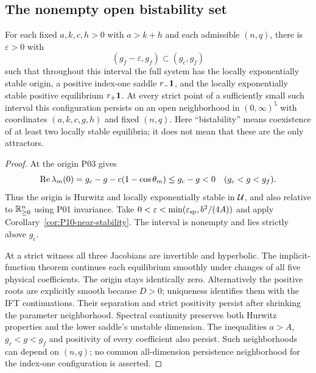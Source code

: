 \subsection{The nonempty open bistability set}
\label{slot:P10-3}

\begin{theorem}
\label{thm:P10-bistability}
For each fixed $a,k,c,h>0$ with $a>k+h$ and each admissible $(n,q)$,
there is $\varepsilon>0$ with
\begin{equation}
 (g_f-\varepsilon,g_f)\subset(g_c,g_f)
 \label{eq:P10-bistable-interval}
\end{equation}
such that throughout this interval the full system has the locally
exponentially stable origin, a positive index-one saddle $r_-\mathbf{1}$,
and the locally exponentially stable positive equilibrium $r_+\mathbf{1}$.
At every strict point of a sufficiently small such interval this
configuration persists on an open neighborhood in $(0,\infty)^5$
with coordinates $(a,k,c,g,h)$ and fixed $(n,q)$.
Here ``bistability'' means coexistence of at least two locally stable
equilibria; it does not mean that these are the only attractors.
\end{theorem}
\begin{proof}
At the origin P03 gives
\[
 \operatorname{Re}\lambda_m(0)=g_c-g-c(1-\cos\theta_m)\le g_c-g<0
 \quad(g_c<g<g_f).
\]
Thus the origin is Hurwitz and locally exponentially stable in
$\mathcal{U}$, and also relative to $\mathbb{R}_{\geq 0}^{n}$ using P01 invariance.
Take $0<\varepsilon<\min(\varepsilon_{\rm sp},b^2/(4A))$ and
apply Corollary~\ref{cor:P10-near-stability}. The interval is nonempty
and lies strictly above $g_c$.

At a strict witness all three Jacobians are invertible and hyperbolic.
The implicit-function theorem continues each equilibrium smoothly
under changes of all five physical coefficients. The origin stays
identically zero. Alternatively the positive roots are explicitly
smooth because $D>0$; uniqueness identifies them with the IFT
continuations. Their separation and strict positivity persist after
shrinking the parameter neighborhood. Spectral continuity preserves
both Hurwitz properties and the lower saddle's unstable dimension.
The inequalities $a>A$, $g_c<g<g_f$ and positivity of every coefficient
also persist. Such neighborhoods can depend on $(n,q)$; no common
all-dimension persistence neighborhood for the index-one configuration
is asserted.
\end{proof}

